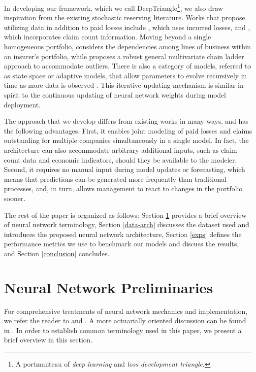 \documentclass[risks,article,submit,moreauthors,pdftex]{mdpi}
\begin{document}
In developing our framework, which we call DeepTriangle\footnote{A portmanteau of \emph{deep learning} and \emph{loss development triangle}.}, we also draw inspiration from the existing stochastic reserving literature. Works that propose utilizing data in addition to paid losses include \citet{quarg2004munich}, which uses incurred losses, and \citet{miranda2012double}, which incorporates claim count information. Moving beyond a single homogeneous portfolio, \citet{avanzi2016stochastic} considers the dependencies among lines of business within an insurer's portfolio, while \citet{peremans2018robust} proposes a robust general multivariate chain ladder approach to accommodate outliers. There is also a category of models, referred to as state space or adaptive models, that allow parameters to evolve recursively in time as more data is observed \citep{chukhrova2017state}. This iterative updating mechanism is similar in spirit to the continuous updating of neural network weights during model deployment.

The approach that we develop differs from existing works in many ways, and has the following advantages. First, it enables joint modeling of paid losses and claims outstanding for multiple companies simultaneously in a single model. In fact, the architecture can also accommodate arbitrary additional inputs, such as claim count data and economic indicators, should they be available to the modeler. Second, it requires no manual input during model updates or forecasting, which means that predictions can be generated more frequently than traditional processes, and, in turn, allows management to react to changes in the portfolio sooner.

The rest of the paper is organized as follows: Section \ref{prelim} provides a brief overview of neural network terminology, Section \ref{data-arch} discusses the dataset used and introduces the proposed neural network architecture, Section \ref{exps} defines the performance metrics we use to benchmark our models and discuss the results, and Section \ref{conclusion} concludes.

\hypertarget{prelim}{%
\section{Neural Network Preliminaries}\label{prelim}}

For comprehensive treatments of neural network mechanics and implementation, we refer the reader to \citet{goodfellow2016deep} and \citet{chollet2018deep}. A more actuarially oriented discussion can be found in \citet{wuthrich2019data}. In order to establish common terminology used in this paper, we present a brief overview in this section.
\end{document}
